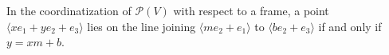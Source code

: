 In the coordinatization of $\mathcal{P}(V)$ with respect to a frame, a point $\langle x e_1 + y e_2 + e_3 \rangle$ lies on the line joining $\langle m e_2 + e_1 \rangle$ to $\langle b e_2 + e_3 \rangle$ if and only if $y = xm + b$.
